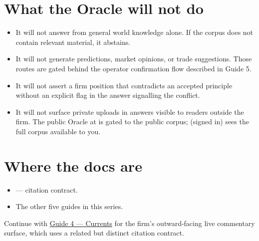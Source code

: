 \documentclass[11pt]{article}
\begin{document}
\section{What the Oracle will not do}

\begin{itemize}[leftmargin=*,itemsep=0.2em]
  \item It will not answer from general world knowledge alone. If the
        corpus does not contain relevant material, it abstains.
  \item It will not generate predictions, market opinions, or trade
        suggestions. Those routes are gated behind the operator
        confirmation flow described in Guide 5.
  \item It will not assert a firm position that contradicts an
        accepted principle without an explicit flag in the answer
        signalling the conflict.
  \item It will not surface private uploads in answers visible to
        readers outside the firm. The public Oracle at 
        is gated to the public corpus;  (signed in)
        sees the full corpus available to you.
\end{itemize}

\section{Where the docs are}

\begin{itemize}[leftmargin=*,itemsep=0.2em]
  \item {} --- citation
        contract.
  \item The other five guides in this series.
\end{itemize}

\begin{nextup}
Continue with \href{04_Currents.pdf}{Guide 4 --- Currents} for the
firm's outward-facing live commentary surface, which uses a related
but distinct citation contract.
\end{nextup}
\end{document}
